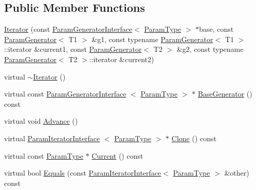 \subsection*{\-Public \-Member \-Functions}
\begin{DoxyCompactItemize}
\item 
\hyperlink{classtesting_1_1internal_1_1CartesianProductGenerator2_1_1Iterator_ad6bd47d32332cafdc1d6a9d30550d8a2}{\-Iterator} (const \hyperlink{classtesting_1_1internal_1_1ParamGeneratorInterface}{\-Param\-Generator\-Interface}$<$ \hyperlink{classtesting_1_1internal_1_1CartesianProductGenerator2_aa0cb85aed1e62dc1934db8788770bedc}{\-Param\-Type} $>$ $\ast$base, const \hyperlink{classtesting_1_1internal_1_1ParamGenerator}{\-Param\-Generator}$<$ \-T1 $>$ \&g1, const typename \hyperlink{classtesting_1_1internal_1_1ParamGenerator}{\-Param\-Generator}$<$ \-T1 $>$\-::iterator \&current1, const \hyperlink{classtesting_1_1internal_1_1ParamGenerator}{\-Param\-Generator}$<$ \-T2 $>$ \&g2, const typename \hyperlink{classtesting_1_1internal_1_1ParamGenerator}{\-Param\-Generator}$<$ \-T2 $>$\-::iterator \&current2)
\item 
virtual \hyperlink{classtesting_1_1internal_1_1CartesianProductGenerator2_1_1Iterator_a47b331bac1d130f2bab2c40e76ccb54a}{$\sim$\-Iterator} ()
\item 
virtual const \*
\hyperlink{classtesting_1_1internal_1_1ParamGeneratorInterface}{\-Param\-Generator\-Interface}\*
$<$ \hyperlink{classtesting_1_1internal_1_1CartesianProductGenerator2_aa0cb85aed1e62dc1934db8788770bedc}{\-Param\-Type} $>$ $\ast$ \hyperlink{classtesting_1_1internal_1_1CartesianProductGenerator2_1_1Iterator_a297272d14c33d1d5423da2a4776f895b}{\-Base\-Generator} () const 
\item 
virtual void \hyperlink{classtesting_1_1internal_1_1CartesianProductGenerator2_1_1Iterator_aaa5a890708f89affa1a7726cf152c872}{\-Advance} ()
\item 
virtual \hyperlink{classtesting_1_1internal_1_1ParamIteratorInterface}{\-Param\-Iterator\-Interface}\*
$<$ \hyperlink{classtesting_1_1internal_1_1CartesianProductGenerator2_aa0cb85aed1e62dc1934db8788770bedc}{\-Param\-Type} $>$ $\ast$ \hyperlink{classtesting_1_1internal_1_1CartesianProductGenerator2_1_1Iterator_a4bee4982ee1152c6935ffd0c2d749421}{\-Clone} () const 
\item 
virtual const \hyperlink{classtesting_1_1internal_1_1CartesianProductGenerator2_aa0cb85aed1e62dc1934db8788770bedc}{\-Param\-Type} $\ast$ \hyperlink{classtesting_1_1internal_1_1CartesianProductGenerator2_1_1Iterator_ab27aeab5db14a30f077a37989ce9261c}{\-Current} () const 
\item 
virtual bool \hyperlink{classtesting_1_1internal_1_1CartesianProductGenerator2_1_1Iterator_a8f18f9a017a12730cce28c07460bbc14}{\-Equals} (const \hyperlink{classtesting_1_1internal_1_1ParamIteratorInterface}{\-Param\-Iterator\-Interface}$<$ \hyperlink{classtesting_1_1internal_1_1CartesianProductGenerator2_aa0cb85aed1e62dc1934db8788770bedc}{\-Param\-Type} $>$ \&other) const 
\end{DoxyCompactItemize}
